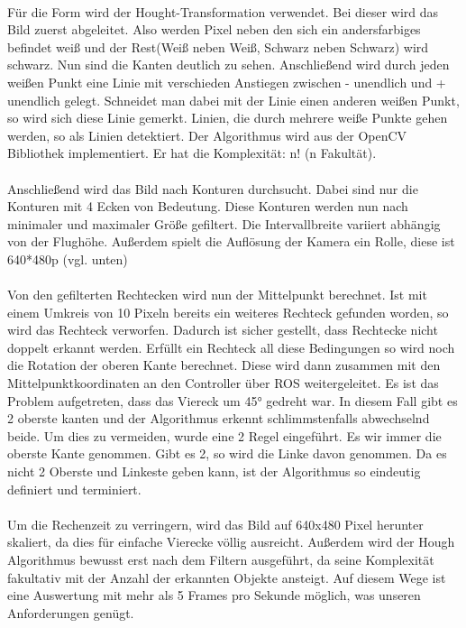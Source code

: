 \\
Für die Form wird der Hought-Transformation verwendet. Bei dieser wird das Bild zuerst abgeleitet. Also werden Pixel neben den sich ein andersfarbiges befindet weiß und der Rest(Weiß neben Weiß, Schwarz neben Schwarz) wird schwarz. Nun sind die Kanten deutlich zu sehen. Anschließend wird durch jeden weißen Punkt eine Linie mit verschieden Anstiegen zwischen - unendlich und + unendlich gelegt. Schneidet man dabei mit der Linie einen anderen weißen Punkt, so wird sich diese Linie gemerkt. Linien, die durch mehrere weiße Punkte gehen werden, so als Linien detektiert. Der Algorithmus wird aus der OpenCV Bibliothek implementiert. Er hat die Komplexität: n! (n Fakultät).\\
\\
Anschließend wird das Bild nach Konturen durchsucht. Dabei sind nur die Konturen mit 4 Ecken von Bedeutung. Diese Konturen werden nun nach minimaler und maximaler Größe gefiltert. Die Intervallbreite variiert abhängig von der Flughöhe. Außerdem spielt die Auflösung der Kamera ein Rolle, diese ist 640*480p (vgl. unten)\\
\\
Von den gefilterten Rechtecken wird nun der Mittelpunkt berechnet. Ist mit einem Umkreis von 10 Pixeln bereits ein weiteres Rechteck gefunden worden, so wird das Rechteck verworfen. Dadurch ist sicher gestellt, dass Rechtecke nicht doppelt erkannt werden. Erfüllt ein Rechteck all diese Bedingungen so wird noch die Rotation der oberen Kante berechnet. Diese wird dann zusammen mit den Mittelpunktkoordinaten an den Controller über ROS weitergeleitet. Es ist das Problem aufgetreten, dass das Viereck um 45° gedreht war. In diesem Fall gibt es 2 oberste kanten und der Algorithmus erkennt schlimmstenfalls abwechselnd beide. Um dies zu vermeiden, wurde eine 2 Regel eingeführt. Es wir immer die oberste Kante genommen. Gibt es 2, so wird die Linke davon genommen. Da es nicht 2 Oberste und Linkeste geben kann, ist der Algorithmus so eindeutig definiert und terminiert.\\
\\
Um die Rechenzeit zu verringern, wird das Bild auf 640x480 Pixel herunter skaliert, da dies für einfache Vierecke völlig ausreicht. Außerdem wird der Hough Algorithmus bewusst erst nach dem Filtern ausgeführt, da seine Komplexität fakultativ mit der Anzahl der erkannten Objekte ansteigt. Auf diesem Wege ist eine Auswertung mit mehr als 5 Frames pro Sekunde möglich, was unseren Anforderungen genügt.\\
